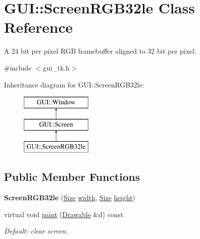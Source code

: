\hypertarget{classGUI_1_1ScreenRGB32le}{\section{G\-U\-I\-:\-:Screen\-R\-G\-B32le Class Reference}
\label{classGUI_1_1ScreenRGB32le}
}


A 24 bit per pixel R\-G\-B framebuffer aligned to 32 bit per pixel.  




{\ttfamily \#include $<$gui\-\_\-tk.\-h$>$}

Inheritance diagram for G\-U\-I\-:\-:Screen\-R\-G\-B32le\-:\begin{figure}[H]
\begin{center}
\leavevmode
\includegraphics[height=3.000000cm]{classGUI_1_1ScreenRGB32le}
\end{center}
\end{figure}
\subsection*{Public Member Functions}
\begin{DoxyCompactItemize}
\item 
\hypertarget{classGUI_1_1ScreenRGB32le_a99133fcf62ee39b426d28be3c5b798b6}{{\bfseries Screen\-R\-G\-B32le} (\hyperlink{namespaceGUI_a10b6232e08729baa0bd211a86a69ce36}{Size} \hyperlink{classGUI_1_1Window_a6cd42974c2b9239d05dac79d284f427d}{width}, \hyperlink{namespaceGUI_a10b6232e08729baa0bd211a86a69ce36}{Size} \hyperlink{classGUI_1_1Window_a5bbb3975f91e7572fc1a91c44e59d212}{height})}\label{classGUI_1_1ScreenRGB32le_a99133fcf62ee39b426d28be3c5b798b6}

\item 
\hypertarget{classGUI_1_1ScreenRGB32le_af40307f3d0a37645b9ce73d9f95ba557}{virtual void \hyperlink{classGUI_1_1ScreenRGB32le_af40307f3d0a37645b9ce73d9f95ba557}{paint} (\hyperlink{classGUI_1_1Drawable}{Drawable} \&d) const }\label{classGUI_1_1ScreenRGB32le_af40307f3d0a37645b9ce73d9f95ba557}

\begin{DoxyCompactList}\small\item\em Default\-: clear screen. \end{DoxyCompactList}\end{DoxyCompactItemize}
